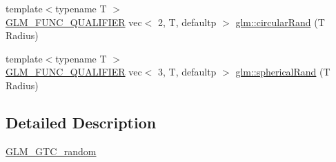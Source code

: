 \begin{DoxyCompactItemize}
\item 
{\footnotesize template$<$typename T $>$ }\\\mbox{\hyperlink{setup_8hpp_a33fdea6f91c5f834105f7415e2a64407}{G\+L\+M\+\_\+\+F\+U\+N\+C\+\_\+\+Q\+U\+A\+L\+I\+F\+I\+ER}} vec$<$ 2, T, defaultp $>$ \mbox{\hyperlink{group__gtc__random_ga9dd05c36025088fae25b97c869e88517}{glm\+::circular\+Rand}} (T Radius)
\item 
{\footnotesize template$<$typename T $>$ }\\\mbox{\hyperlink{setup_8hpp_a33fdea6f91c5f834105f7415e2a64407}{G\+L\+M\+\_\+\+F\+U\+N\+C\+\_\+\+Q\+U\+A\+L\+I\+F\+I\+ER}} vec$<$ 3, T, defaultp $>$ \mbox{\hyperlink{group__gtc__random_ga22f90fcaccdf001c516ca90f6428e138}{glm\+::spherical\+Rand}} (T Radius)
\end{DoxyCompactItemize}


\subsection{Detailed Description}
\mbox{\hyperlink{group__gtc__random}{G\+L\+M\+\_\+\+G\+T\+C\+\_\+random}} 